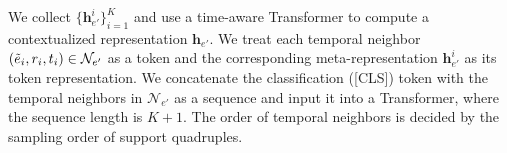 \documentclass[runningheads]{llncs}
\begin{document}
We collect $\{\mathbf{h}_{e'}^{i}\}_{i=1}^K$ and use a time-aware Transformer to compute a contextualized representation $\mathbf{h}_{e'}$. We treat each temporal neighbor $(\Tilde{e}_i, r_i, t_i) \in \mathcal{N}_{e'}$ as a token and the corresponding meta-representation $\mathbf{h}_{e'}^{i}$ as its token representation. We concatenate the classification ([CLS]) token with the temporal neighbors in $\mathcal{N}_{e'}$ as a sequence and input it into a Transformer, where the sequence length is $K+1$. The order of temporal neighbors is decided by the sampling order of support quadruples.
\end{document}
